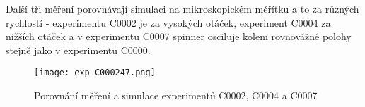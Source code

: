 Další tři měření porovnávají simulaci na mikroskopickém měřítku a to za různých rychlostí - experimentu C0002 je za vysokých otáček, experiment C0004 za nižších otáček a v experimentu C0007 spinner osciluje kolem rovnovážné polohy stejně jako v experimentu C0000.

\begin{figure}[!ht]
    \texttt{[image: exp\_C000247.png]}
    \centering
    \caption{Porovnání měření a simulace experimentů C0002, C0004 a C0007}
    \label{fig:exp_C000247}
\end{figure}
